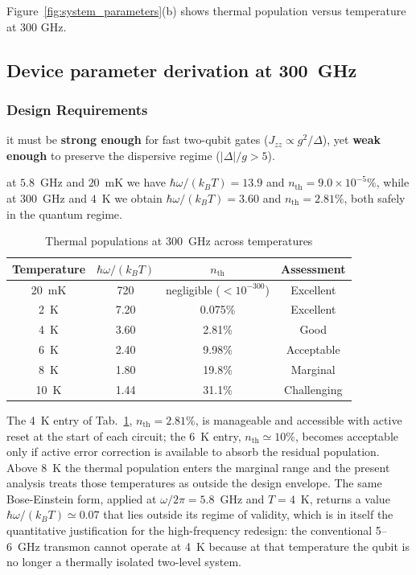 Figure~\ref{fig:system_parameters}(b) shows thermal population versus temperature at 300 GHz.


\subsection{Device parameter derivation at 300~GHz}

\subsubsection{Design Requirements}

it must be \textbf{strong enough} for fast two-qubit gates ($J_{zz} \propto g^2/\Delta$), yet \textbf{weak enough} to preserve the dispersive regime ($|\Delta|/g > 5$).

at $5.8$~GHz and $20$~mK we have $\hbar\omega/(k_B T) = 13.9$ and $n_{\text{th}} = 9.0\times10^{-5}\%$, while at $300$~GHz and $4$~K we obtain $\hbar\omega/(k_B T) = 3.60$ and $n_{\text{th}} = 2.81\%$, both safely in the quantum regime.

\begin{table}[h]
\centering
\begin{tabular}{@{}cccc@{}}
\toprule
\textbf{Temperature} & \textbf{$\hbar\omega/(k_B T)$} & \textbf{$n_{\text{th}}$} & \textbf{Assessment} \\
\midrule
20~mK & 720 & negligible ($<10^{-300}$) & Excellent \\
2~K & 7.20 & 0.075\% & Excellent \\
4~K & 3.60 & 2.81\% & Good \\
6~K & 2.40 & 9.98\% & Acceptable \\
8~K & 1.80 & 19.8\% & Marginal \\
10~K & 1.44 & 31.1\% & Challenging \\
\bottomrule
\end{tabular}
\caption{Thermal populations at 300~GHz across temperatures}
\label{tab:300ghz_thermal}
\end{table}

The 4~K entry of Tab.~\ref{tab:300ghz_thermal}, $n_{\text{th}} = 2.81\%$, is manageable and accessible with active reset at the start of each circuit; the 6~K entry, $n_{\text{th}}\simeq 10\%$, becomes acceptable only if active error correction is available to absorb the residual population. Above 8~K the thermal population enters the marginal range and the present analysis treats those temperatures as outside the design envelope. The same Bose-Einstein form, applied at $\omega/2\pi = 5.8$~GHz and $T = 4$~K, returns a value $\hbar\omega/(k_BT)\simeq 0.07$ that lies outside its regime of validity, which is in itself the quantitative justification for the high-frequency redesign: the conventional 5--6~GHz transmon cannot operate at 4~K because at that temperature the qubit is no longer a thermally isolated two-level system.

